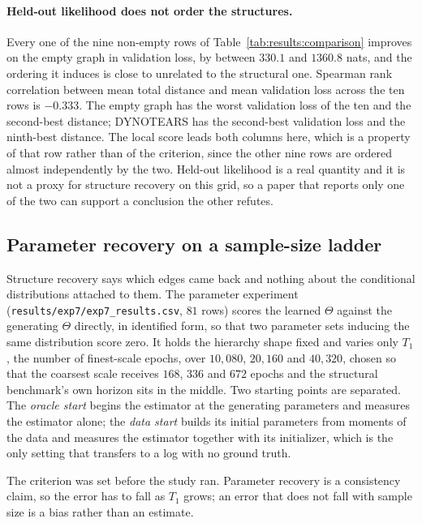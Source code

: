 \paragraph{Held-out likelihood does not order the structures.}
Every one of the nine non-empty rows of
Table~\ref{tab:results:comparison} improves on the empty graph in validation
loss, by between $330.1$ and $1360.8$ nats, and the ordering it induces is close
to unrelated to the structural one. Spearman rank correlation between
mean total distance and mean validation loss across the ten rows is $-0.333$.
The empty graph has the worst validation loss of the ten and
the second-best distance; DYNOTEARS has the second-best validation loss and the
ninth-best distance. The local score leads both columns here, which is a
property of that row rather than of the criterion, since the other nine rows
are ordered almost independently by the two. Held-out likelihood is a real
quantity and it is not a proxy for structure recovery on this grid, so a paper
that reports only one of the two can support a conclusion the other refutes.

\subsection{Parameter recovery on a sample-size ladder}
\label{sec:results:params}

Structure recovery says which edges came back and nothing about the conditional
distributions attached to them. The parameter experiment
(\texttt{results/exp7/exp7\_results.csv}, $81$ rows) scores the learned
$\Theta$ against the generating $\Theta$ directly, in identified form, so that
two parameter sets inducing the same distribution score zero. It holds the
hierarchy shape fixed and varies only $T_1$, the number of finest-scale epochs,
over $10{,}080$, $20{,}160$ and $40{,}320$, chosen so that the coarsest scale
receives $168$, $336$ and $672$ epochs and the structural benchmark's own
horizon sits in the middle. Two starting points are separated. The
\emph{oracle start} begins the estimator at the generating parameters and
measures the estimator alone; the \emph{data start} builds its initial
parameters from moments of the data and measures the estimator together with
its initializer, which is the only setting that transfers to a log with no
ground truth.

The criterion was set before the study ran. Parameter recovery is a consistency
claim, so the error has to fall as $T_1$ grows; an error that does not fall
with sample size is a bias rather than an estimate.

